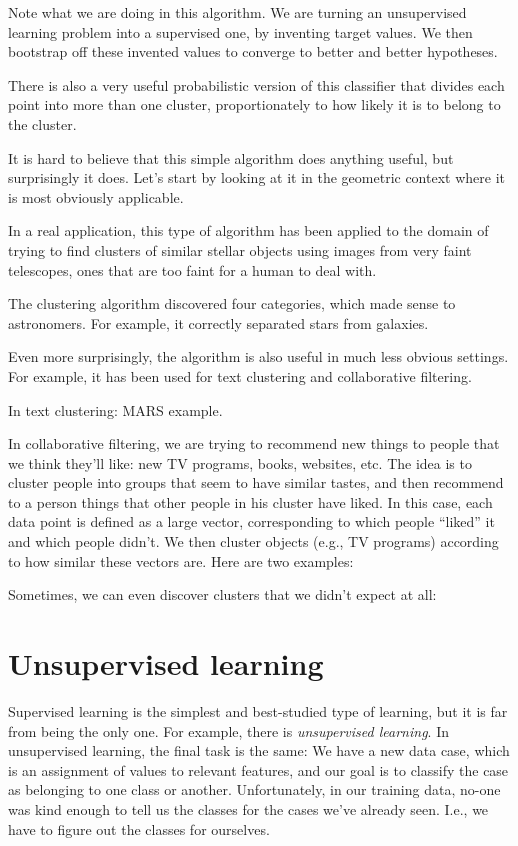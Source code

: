 Note what we are doing in this algorithm.  We are turning an
unsupervised learning problem into a supervised one, by inventing
target values.  We then bootstrap off these invented values to
converge to better and better hypotheses.  

There is also a very useful probabilistic version of this classifier
that divides each point into more than one cluster, proportionately to
how likely it is to belong to the cluster.

It is hard to believe that this simple algorithm does anything useful, but
surprisingly it does.  Let's start by looking at it in the geometric context
where it is most obviously applicable.


In a real application, this type of algorithm has been applied to the domain
of trying to find clusters of similar stellar objects using images from very
faint telescopes, ones that are too faint for a human to deal with.


The clustering algorithm discovered four categories, which made sense to
astronomers.  For example, it correctly separated stars from galaxies.

Even more surprisingly, the algorithm is also useful in much less obvious
settings.  For example, it has been used for text clustering and 
collaborative filtering. 

In text clustering: MARS example.

In collaborative filtering, we are trying to recommend new things to
people that we think they'll like: new TV programs, books, websites,
etc.  The idea is to cluster people into groups that seem to have
similar tastes, and then recommend to a person things that other
people in his cluster have liked.  In this case, each data point is
defined as a large vector, corresponding to which people ``liked'' it
and which people didn't.  We then cluster objects (e.g., TV programs)
according to how similar these vectors are.  Here are two examples:
  

Sometimes, we can even discover clusters that we didn't expect at all:



\section{Unsupervised learning}
Supervised learning is the simplest and best-studied type of learning, but
it is far from being the only one.  For example, there is {\em unsupervised
learning}.  In unsupervised learning, the final task is the same:  We
have a new data case, which is an assignment of values to relevant features,
and our goal is to classify the case as belonging to one class or another. 
Unfortunately, in our training data, no-one was kind enough to tell us the
classes for the cases we've already seen.  I.e., we have to figure out the
classes for ourselves.  


